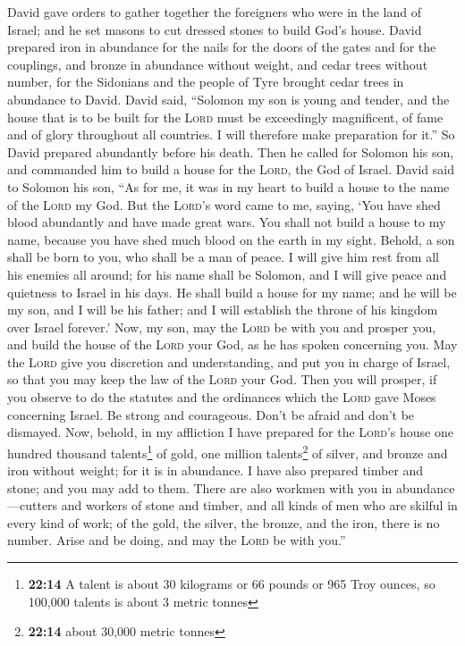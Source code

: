  David gave orders to gather together the foreigners who
were in the land of Israel; and he set masons to cut dressed stones to
build God's house.  David prepared iron in abundance for
the nails for the doors of the gates and for the couplings, and bronze
in abundance without weight,  and cedar trees without
number, for the Sidonians and the people of Tyre brought cedar trees in
abundance to David.  David said, ``Solomon my son is young
and tender, and the house that is to be built for the \textsc{Lord} must
be exceedingly magnificent, of fame and of glory throughout all
countries. I will therefore make preparation for it.'' So David prepared
abundantly before his death.  Then he called for Solomon
his son, and commanded him to build a house for the \textsc{Lord}, the
God of Israel.  David said to Solomon his son, ``As for
me, it was in my heart to build a house to the name of the \textsc{Lord}
my God.  But the \textsc{Lord}'s word came to me, saying,
`You have shed blood abundantly and have made great wars. You shall not
build a house to my name, because you have shed much blood on the earth
in my sight.  Behold, a son shall be born to you, who
shall be a man of peace. I will give him rest from all his enemies all
around; for his name shall be Solomon, and I will give peace and
quietness to Israel in his days.  He shall build a house
for my name; and he will be my son, and I will be his father; and I will
establish the throne of his kingdom over Israel forever.'
 Now, my son, may the \textsc{Lord} be with you and
prosper you, and build the house of the \textsc{Lord} your God, as he
has spoken concerning you.  May the \textsc{Lord} give
you discretion and understanding, and put you in charge of Israel, so
that you may keep the law of the \textsc{Lord} your God. 
Then you will prosper, if you observe to do the statutes and the
ordinances which the \textsc{Lord} gave Moses concerning Israel. Be
strong and courageous. Don't be afraid and don't be dismayed.
 Now, behold, in my affliction I have prepared for the
\textsc{Lord}'s house one hundred thousand talents\footnote{\textbf{22:14}
  A talent is about 30 kilograms or 66 pounds or 965 Troy ounces, so
  100,000 talents is about 3 metric tonnes} of gold, one million
talents\footnote{\textbf{22:14} about 30,000 metric tonnes} of silver,
and bronze and iron without weight; for it is in abundance. I have also
prepared timber and stone; and you may add to them. 
There are also workmen with you in abundance---cutters and workers of
stone and timber, and all kinds of men who are skilful in every kind of
work;  of the gold, the silver, the bronze, and the iron,
there is no number. Arise and be doing, and may the \textsc{Lord} be
with you.''


